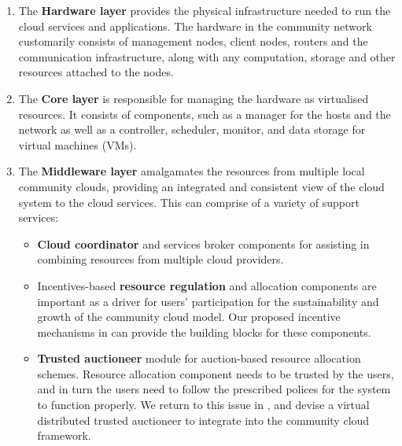 \begin{enumerate}
	
	\item The \textbf{Hardware layer} provides the physical infrastructure needed to run the cloud services and applications. 
	The hardware in the community network customarily consists of management nodes, 
	client nodes, routers and the communication infrastructure, 
	along with any computation, storage and other resources attached to the nodes.
	
	\item The \textbf{Core layer} is responsible for managing the hardware as virtualised resources. 
	It consists of components, such as a manager for the hosts and the network 
	as well as a controller, scheduler, monitor, and data storage for virtual machines (VMs). 

	\item The \textbf{Middleware layer} amalgamates the resources from multiple local community clouds, providing an integrated and consistent view of the cloud system to the cloud services. 
	This can comprise of a variety of support services:

	\begin{itemize}

		\item \textbf{Cloud coordinator} and services broker components for assisting in combining resources from multiple cloud providers.

		\item Incentives-based \textbf{resource regulation} and allocation components 
		are important as a driver for users' participation 
		for the sustainability and growth of the community cloud model.
		Our proposed incentive mechanisms in  can provide the building blocks for these components.

		\item \textbf{Trusted auctioneer} module for auction-based resource allocation schemes. %
		Resource allocation component needs to be trusted by the users,
		and in turn the users need to follow the prescribed polices for the system to function properly.
		We return to this issue in , and devise a virtual distributed trusted auctioneer
		to integrate into the community cloud framework.


\end{itemize}
\end{enumerate}
